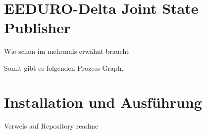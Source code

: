 \section{EEDURO-Delta Joint State Publisher}
Wie schon im mehrmals erwähnt braucht %


Somit gibt es folgenden Prozess Graph.






\section{Installation und Ausführung}
Verweis auf Repository readme